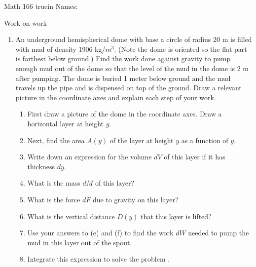 \documentclass[12pt]{article}
\begin{document}
\pagestyle{empty} %

\noindent
{Math 166  truein  Names:\ \hrulefill}

\noindent
{Work on work}



\begin{enumerate}

\item An underground hemispherical dome with base a circle of radius 20 m is filled with mud of density 1906 kg/$m^3$. (Note the dome  is oriented so the flat part is farthest below ground.) Find the work done against gravity to pump enough mud out of the dome so that the level of the mud in the dome is 2 m after pumping. The dome is buried 1 meter below ground and the mud travels up the pipe and is dispensed on top of the ground. Draw a relevant picture in the coordinate axes and explain each step of your work.

\begin{enumerate}
\item First draw a picture of the dome in the coordinate axes. 
Draw a horizontal layer at height $y$.
\vspace{2in}
\item Next, find the area $A(y)$ of the layer at height $y$ as a function of $y$.
\vspace{1in}
\item Write down an expression for the volume $dV$ of this layer if it has thickness $dy$.
\vspace{0.5in}
\item What is the mass $dM$ of this layer?
\vfill

\item What is the force $dF$ due to gravity on this layer? 
\vfill
\item What is the vertical distance $D(y)$ that this layer is lifted? 
\vfill
\item Use your answers to (e) and (f) to find the work $dW$ needed to pump the mud in this layer out of the spout.
\vfill
\item Integrate this expression to solve the problem .
\vfill
\end{enumerate}


\end{enumerate}
\end{document}
